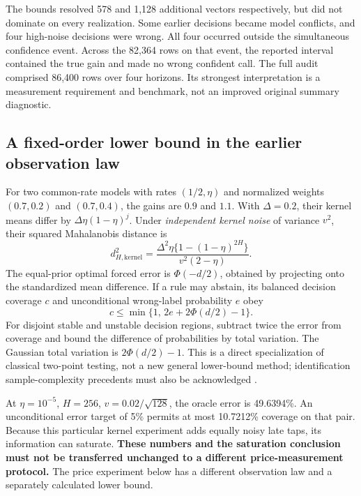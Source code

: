 \documentclass[11pt,a4paper]{article}
\theoremstyle{definition}
\theoremstyle{remark}
\begin{document}
The bounds resolved 578 and 1,128 additional vectors respectively, but did not dominate on every realization. Some earlier decisions became model conflicts, and four high-noise decisions were wrong. All four occurred outside the simultaneous confidence event. Across the 82,364 rows on that event, the reported interval contained the true gain and made no wrong confident call. The full audit comprised 86,400 rows over four horizons. Its strongest interpretation is a measurement requirement and benchmark, not an improved original summary diagnostic.

\subsection{A fixed-order lower bound in the earlier observation law}
For two common-rate models with rates $(1/2,\eta)$ and normalized weights $(0.7,0.2)$ and $(0.7,0.4)$, the gains are $0.9$ and $1.1$. With $\Delta=0.2$, their kernel means differ by $\Delta\eta(1-\eta)^j$. Under \emph{independent kernel noise} of variance $v^2$, their squared Mahalanobis distance is
\begin{equation}
 d_{H,\mathrm{kernel}}^2=
 \frac{\Delta^2\eta\{1-(1-\eta)^{2H}\}}{v^2(2-\eta)}.
 \label{eq:kernel_distance_retained}
\end{equation}
The equal-prior optimal forced error is $\Phi(-d/2)$, obtained by projecting onto the standardized mean difference. If a rule may abstain, its balanced decision coverage $c$ and unconditional wrong-label probability $e$ obey
\begin{equation}
 c\le \min\{1,\,2e+2\Phi(d/2)-1\}.
 \label{eq:retained_coverage_limit}
\end{equation}
For disjoint stable and unstable decision regions, subtract twice the error from coverage and bound the difference of probabilities by total variation. The Gaussian total variation is $2\Phi(d/2)-1$. This is a direct specialization of classical two-point testing, not a new general lower-bound method; identification sample-complexity precedents must also be acknowledged \citep{jedra2019}.

At $\eta=10^{-5}$, $H=256$, $v=0.02/\sqrt{128}$, the oracle error is 49.6394\%. An unconditional error target of 5\% permits at most 10.7212\% coverage on that pair. Because this particular kernel experiment adds equally noisy late taps, its information can saturate. \textbf{These numbers and the saturation conclusion must not be transferred unchanged to a different price-measurement protocol.} The price experiment below has a different observation law and a separately calculated lower bound.
\end{document}

